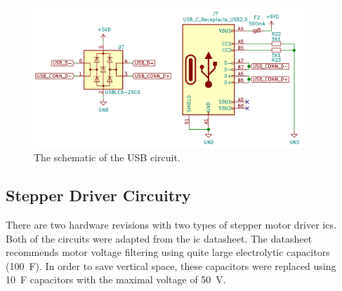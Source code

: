 \begin{figure}[H]
    \centering
    \includegraphics[width=0.9\textwidth]{obrazky/schem_usb}
    \caption{The schematic of the USB circuit.}
    \label{fig:schem_usb}
\end{figure}

\subsection{Stepper Driver Circuitry}
\label{subsec:stepper_circuitry}
There are two hardware revisions with two types of stepper motor driver \acs{ic}s.
Both of the circuits were adapted from the \acs{ic} datasheet\cite{trinamic_tmc2100-datasheet_2018, trinamic_tmc2226_2020}.
The datasheet recommends motor voltage filtering using quite large electrolytic capacitors (100~\textmu F).
In order to save vertical space, these capacitors were replaced using 10~\textmu F capacitors with the maximal voltage of 50~V.

